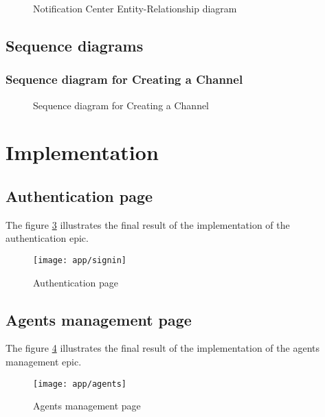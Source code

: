 \begin{landscape}
    \begin{figure}[hbt!]
        \centering
        
        \caption{Notification Center Entity-Relationship diagram}
        \label{g-erd}
    \end{figure}
\end{landscape}


\subsection{Sequence diagrams}
\subsubsection{Sequence diagram for Creating a Channel}


\begin{landscape}
    \begin{figure}[hbt!]
        \centering
        
        \caption{Sequence diagram for Creating a Channel}
        \label{seq-create-channel}
    \end{figure}
\end{landscape}



\section{Implementation}
\subsection{Authentication page}
The figure \ref{ss-signin} illustrates the final result of the implementation of the authentication epic.
\begin{figure}[hbt!]
    \centering
    \texttt{[image: app/signin]}
    \caption{Authentication page}
    \label{ss-signin}
\end{figure}

\subsection{Agents management page}
The figure \ref{ss-agents} illustrates the final result of the implementation of the agents management epic.
\begin{figure}[hbt!]
    \centering
    \texttt{[image: app/agents]}
    \caption{Agents management page}
    \label{ss-agents}
\end{figure}

